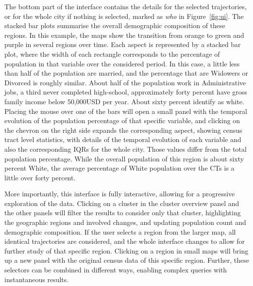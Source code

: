 The bottom part of the interface contains the details for the selected
trajectories, or for the whole city if nothing is selected, marked as \emph{who}
in Figure~\ref{fig:ui}. The stacked bar plots summarise the overall demographic
composition of these regions. In this example, the maps show the transition from
orange to green and purple in several regions over time. Each aspect is
represented by a stacked bar plot, where the width of each rectangle corresponds
to the percentage of population in that variable over the considered period. In
this case, a little less than half of the population are married, and the
percentage that are Widowers or Divorced is roughly similar. About half of the
population work in Administrative jobs, a third never completed high-school,
approximately forty percent have gross family income below 50,000USD per year.
About sixty percent identify as white. Placing the mouse over one of the bars
will open a small panel with the temporal evolution of the population percentage
of that specific variable, and clicking on the chevron on the right side expands
the corresponding aspect, showing census tract level statistics, with details of
the temporal evolution of each variable and also the corresponding IQRs for the
whole city. Those values differ from the total population percentage. While the
overall population of this region is about sixty percent White, the average
percentage of White population over the CTs is a little over forty percent.

More importantly, this interface is fully interactive, allowing for a
progressive exploration of the data. Clicking on a cluster in the cluster
overview panel and the other panels will filter the results to consider only
that cluster, highlighting the geographic regions and involved changes, and
updating population count and demographic composition. If the user selects a
region from the larger map, all identical trajectories are considered, and the
whole interface changes to allow for further study of that specific region.
Clicking on a region in small maps will bring up a new panel with the original
census data of this specific region. Further, these selectors can be combined in
different ways, enabling complex queries with instantaneous results.
